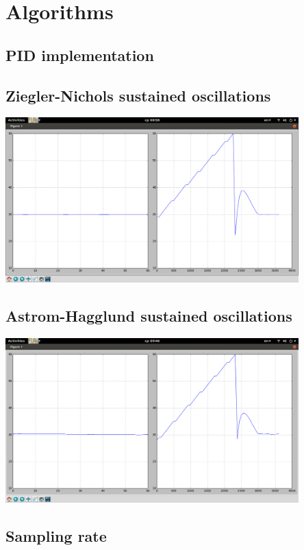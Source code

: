 \section{Algorithms}
\subsection{PID implementation}

\subsection{Ziegler-Nichols sustained oscillations}
\includegraphics[width=0.85\textwidth]{../images/exp_gain100}~

\subsection{Astrom-Hagglund sustained oscillations}
\includegraphics[width=0.85\textwidth]{../images/exp_relay}~

\subsection{Sampling rate}


